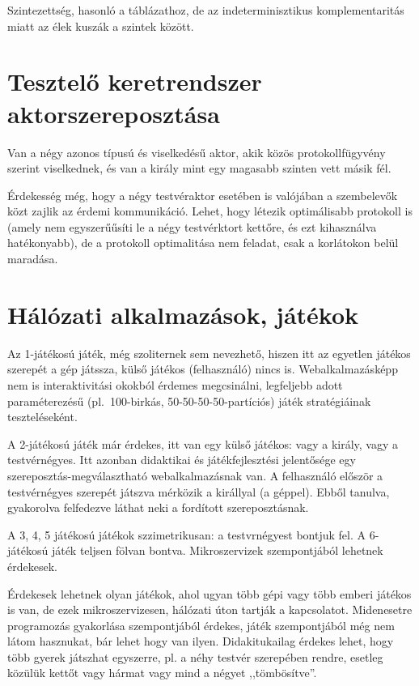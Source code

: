 \documentclass{article}
\begin{document}
	Szintezettség, hasonló a táblázathoz, de az indeterminisztikus komplementaritás miatt az élek kuszák a szintek között.

	\section{Tesztelő keretrendszer aktorszereposztása}

	Van a négy azonos típusú és viselkedésű aktor, akik közös protokollfügyvény szerint viselkednek, és van a király mint egy magasabb szinten vett másik fél.

	Érdekesség még, hogy a négy testvéraktor esetében is valójában a szembelevők közt zajlik az érdemi kommunikáció. Lehet, hogy létezik optimálisabb protokoll is (amely nem egyszerűűsíti le a négy testvérktort kettőre, és ezt kihasználva hatékonyabb), de a protokoll optimalitása nem feladat, csak a korlátokon belül maradása.

	\section{Hálózati alkalmazások, játékok}

	Az 1-játékosú játék, még szoliternek sem nevezhető, hiszen itt az egyetlen játékos szerepét a gép játssza, külső játékos (felhasználó) nincs is. Webalkalmazásképp nem is interaktivitási okokból érdemes megcsinálni, legfeljebb adott paraméterezésű (pl.~100-birkás, 50-50-50-50-partíciós) játék stratégiáinak teszteléseként.

	A 2-játékosú játék már érdekes, itt van egy külső játékos: vagy a király, vagy a testvérnégyes. Itt azonban didaktikai és játékfejlesztési jelentősége egy szereposztás-megválasztható webalkalmazásnak van. A felhasználó először a testvérnégyes szerepét játszva mérközik a királlyal (a géppel). Ebből tanulva, gyakorolva felfedezve láthat neki a fordított szereposztásnak.

	A 3, 4, 5 játékosú játékok szzimetrikusan: a testvrnégyest bontjuk fel. A 6-játékosú játék teljsen fölvan bontva. Mikroszervizek szempontjából lehetnek érdekesek.

	Érdekesek lehetnek olyan játékok, ahol ugyan több gépi vagy több emberi játékos is van, de ezek mikroszervizesen, hálózati úton tartják a kapcsolatot. Midenesetre programozás gyakorlása szempontjából érdekes, játék szempontjából még nem látom hasznukat, bár lehet hogy van ilyen. Didakitukailag érdekes lehet, hogy több gyerek játszhat egyszerre, pl. a néhy testvér szerepében rendre, esetleg közülük kettőt vagy hármat vagy mind a négyet ,,tömbösítve''.
\end{document}
